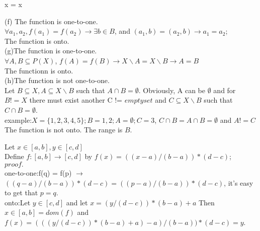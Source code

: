 \documentclass[a4paper, justified]{tufte-handout}
\begin{document}
\begin{problem}[UD Problem 14.23]
\end{problem}

\begin{solution}
	x = x
\end{solution}

\begin{problem}[UD Problem 15.10 (f, g, h)]
\end{problem}

\begin{solution}
	(f) The function is one-to-one. \\
	$\forall a_1, a_2,f(a_1) = f(a_2) \rightarrow \exists b\in B$, and  $(a_1, b) = (a_2, b) \rightarrow a_1 = a_2$;\\
	The function is onto.\\

	(g)The function is one-to-one.\\
	$\forall A, B \subseteq P(X)$, $f(A) = f(B) \rightarrow X \backslash A = X \backslash B \rightarrow A = B$\\
	The functionn is onto.\\
	(h)The function is not one-to-one.\\
	Let $B \subseteq X, A \subseteq X \backslash B$ such that $A \cap B = \emptyset$. Obviously, A can be $\emptyset$ and for $B != X$ there must exist another C != $emptyset$ and $C \subseteq X \backslash B$ such that $C \cap B = \emptyset$.\\
	example:$X = \{1, 2, 3, 4, 5\}; B = {1, 2}; A = \emptyset; C = {3}$, $C \cap B = A \cap B = \emptyset$ and $A != C$\\
	The function is not onto. The range is $B$.

\end{solution}

\begin{problem}[UD Problem 15.14]
\end{problem}

\begin{solution}
	Let $x \in [a, b], y \in [c, d]$\\
	Define $f:[a, b]\rightarrow [c, d]$ by $f(x) = ((x - a) / (b - a)) * (d - c)$;\\
	$proof.$\\
	one-to-one:f(q) = f(p) $\rightarrow$ $((q - a) / (b - a)) * (d - c) = ((p - a) / (b - a)) * (d - c)$, it's easy to get that $p = q$.\\
	onto:Let $y \in [c, d]$ and let $x = (y / (d - c)) * (b - a) + a$ Then $x \in [a, b] = dom(f)$ and $f(x) = (((y / (d - c)) * (b - a) + a) - a) / (b - a)) * (d - c) = y$.\\
\end{solution}
\end{document}

